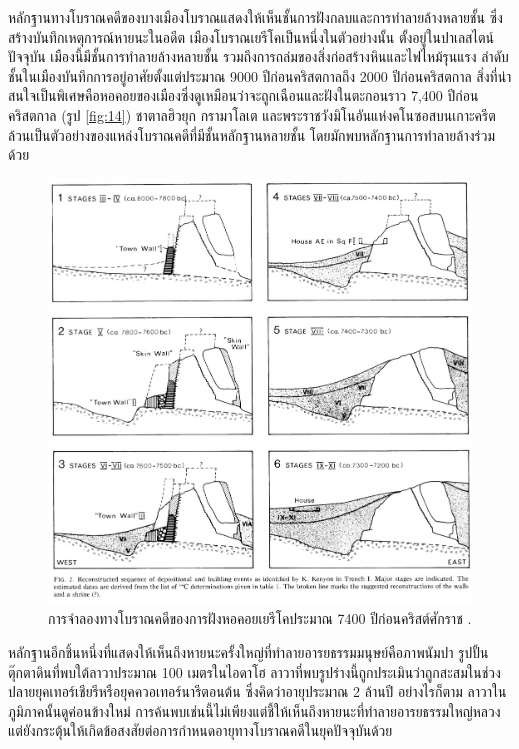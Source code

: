 \documentclass[10pt,twocolumn,letterpaper]{article}
\begin{document}
หลักฐานทางโบราณคดีของบางเมืองโบราณแสดงให้เห็นชั้นการฝังกลบและการทำลายล้างหลายชั้น ซึ่งสร้างบันทึกเหตุการณ์หายนะในอดีต เมืองโบราณเยรีโคเป็นหนึ่งในตัวอย่างนั้น ตั้งอยู่ในปาเลสไตน์ปัจจุบัน เมืองนี้มีชั้นการทำลายล้างหลายชั้น รวมถึงการถล่มของสิ่งก่อสร้างหินและไฟไหม้รุนแรง \cite{96,97} ลำดับชั้นในเมืองบันทึกการอยู่อาศัยตั้งแต่ประมาณ 9000 ปีก่อนคริสตกาลถึง 2000 ปีก่อนคริสตกาล สิ่งที่น่าสนใจเป็นพิเศษคือหอคอยของเมืองซึ่งดูเหมือนว่าจะถูกเฉือนและฝังในตะกอนราว 7,400 ปีก่อนคริสตกาล (รูป \ref{fig:14}) \cite{95} ชาตาลฮิวยุก \cite{99} กรามาโลเต \cite{98} และพระราชวังมิโนอันแห่งคโนซอสบนเกาะครีต \cite{100,101} ล้วนเป็นตัวอย่างของแหล่งโบราณคดีที่มีชั้นหลักฐานหลายชั้น โดยมักพบหลักฐานการทำลายล้างร่วมด้วย

\begin{figure}[t]
\begin{center}

\includegraphics[width=1\linewidth]{jericho.jpg}
\end{center}
   \caption{การจำลองทางโบราณคดีของการฝังหอคอยเยรีโคประมาณ 7400 ปีก่อนคริสต์ศักราช \cite{95}.}
\label{fig:14}
\label{fig:onecol}
\end{figure}

หลักฐานอีกชิ้นหนึ่งที่แสดงให้เห็นถึงหายนะครั้งใหญ่ที่ทำลายอารยธรรมมนุษย์คือภาพนัมปา รูปปั้นตุ๊กตาดินที่พบใต้ลาวาประมาณ 100 เมตรในไอดาโฮ \cite{102,103} ลาวาที่พบรูปร่างนี้ถูกประเมินว่าถูกสะสมในช่วงปลายยุคเทอร์เชียรีหรือยุคควอเทอร์นารีตอนต้น ซึ่งคิดว่าอายุประมาณ 2 ล้านปี อย่างไรก็ตาม ลาวาในภูมิภาคนั้นดูค่อนข้างใหม่ การค้นพบเช่นนี้ไม่เพียงแต่ชี้ให้เห็นถึงหายนะที่ทำลายอารยธรรมใหญ่หลวง แต่ยังกระตุ้นให้เกิดข้อสงสัยต่อการกำหนดอายุทางโบราณคดีในยุคปัจจุบันด้วย
\end{document}
